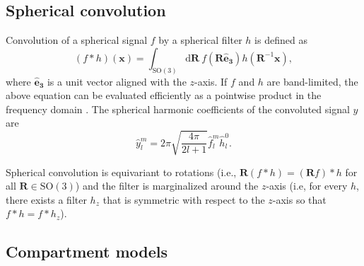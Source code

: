 \documentclass[10pt, letterpaper, oneside]{article}
\begin{document}
\subsection{Spherical convolution}

Convolution of a spherical signal $f$ by a spherical filter $h$ is defined as
\begin{equation}\label{eq:sph_conv}
(f * h)(\mathbf{x}) = \int_{\text{SO}(3)} \text{d}\mathbf{R} \ f(\mathbf{R} \mathbf{\hat{e}_3}) h(\mathbf{R}^{-1} \mathbf{x}) , 
\end{equation}
where $\mathbf{\hat{e}_3}$ is a unit vector aligned with the $z$-axis. If $f$ and $h$ are band-limited, the above equation can be evaluated efficiently as a pointwise product in the frequency domain \citep{driscoll1994computing}. The spherical harmonic coefficients of the convoluted signal $y$ are
\begin{equation}\label{eq:sph_conv_sh}
\hat{y}_l^m = 2 \pi \sqrt{\frac{4 \pi}{2l + 1}} \hat{f}_l^m \hat{h}_l^0 .
\end{equation}

Spherical convolution is equivariant to rotations (i.e., $\mathbf{R}(f * h) = (\mathbf{R}f) * h$ for all $\mathbf{R} \in \text{SO}(3)$) and the filter is marginalized around the $z$-axis (i.e, for every $h$, there exists a filter $h_z$ that is symmetric with respect to the $z$-axis so that $f * h = f * h_z$).

\subsection{Compartment models}
\end{document}

